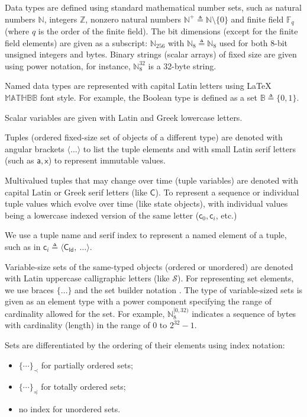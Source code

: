 \documentclass[9pt,oneside]{amsart}
\begin{document}
\begin{multicols}{2}
Data types are defined using standard mathematical number sets, such as
natural numbers $\mathbb{N}$, integers $\mathbb{Z}$,
nonzero natural numbers $\mathbb{N}^+ \triangleq \mathbb{N}\setminus\{0\}$
and finite field $\mathbb{F}_q$ (where $q$ is the order of the finite field).
The bit dimensions (except for the finite field elements) are given as a subscript:
$\mathbb{N}_{256}$ with $\mathbb{N}_8 \triangleq \mathbb{N}_8$ used for both 8-bit
unsigned integers and bytes.
Binary strings (scalar arrays) of fixed size are given using power notation,
for instance, $\mathbb{N}_8^{32}$ is a 32-byte string.

Named data types are represented with capital Latin letters using \LaTeX\ $\mathbb{MATHBB}$ font style.
For example, the Boolean type is defined as a set $\mathbb{B} \triangleq \{0, 1\}$.

Scalar variables are given with Latin and Greek lowercase letters.

Tuples (ordered fixed-size set of objects of a different type) are denoted with angular brackets
$\langle \ldots \rangle$ to list the tuple elements
and with small Latin serif letters (such as $\mathsf{a}, \mathsf{x}$) to represent immutable values.

Multivalued tuples that may change over time (tuple variables) are denoted
with capital Latin or Greek serif letters (like $\mathsf{C}$). To represent
a sequence or individual tuple values which evolve over time (like state objects),
with individual values being a lowercase indexed version of the same letter
($\mathsf{c}_0, \mathsf{c}_i$, etc.)

We use a tuple name and serif index to represent a named element of a tuple,
such as in $\mathsf{c}_i \triangleq \langle \mathsf{C_{Id}}, \ \ldots \rangle$.

Variable-size sets of the same-typed objects (ordered or unordered) are denoted with
Latin uppercase calligraphic letters (like $\mathcal{S}$).
For representing set elements, we use braces $\{\ldots\}$ and the set builder notation \cite{setbuilder}.
The type of variable-sized sets is given as an element type with a power component
specifying the range of cardinality allowed for the set.
For example, $\mathbb{N}_8^{[0, 32)}$ indicates a sequence of bytes with cardinality (length)
in the range of $0$ to $2^{32} - 1$.

Sets are differentiated by the ordering of their elements using index notation:
\begin{itemize}
    \item $\{ \cdots \}_\prec$ for partially ordered sets;
    \item $\{ \cdots \}_\preceq$ for totally ordered sets;
    \item no index for unordered sets.
\end{itemize}


\end{multicols}
\end{document}
